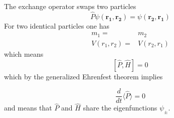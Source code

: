 
The exchange operator swaps two particles
\begin{equation*}
    \widehat{P}\psi(\mathbf{r_1},\mathbf{r_2})=\psi(\mathbf{r_2},\mathbf{r_1})
\end{equation*}
For two identical particles one has
\begin{align*}
    m_1=        & m_2        \\
    V(r_1,r_2)= & V(r_2,r_1)
\end{align*}
which means
\begin{equation*}
    \left[\widehat{P},\widehat{H}\right]=0
\end{equation*}
which by the generalized Ehrenfest theorem implies

\begin{equation*}
    \frac{d}{dt}\langle\widehat{P}\rangle=0
\end{equation*}
and means that $\widehat{P}$ and $\widehat{H}$ share the eigenfunctions $\psi_{\pm}$.


